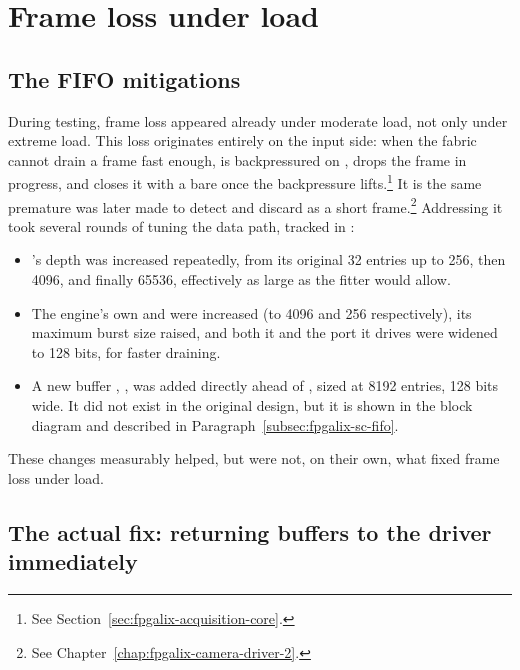 \section{Frame loss under load}
\label{sec:fpgalix-vision-frame-loss}

\subsection{The FIFO mitigations}
\label{subsec:fpgalix-vision-fifo-mitigations}

During testing, frame loss appeared already under moderate  load, not only under extreme load. This loss originates entirely on the input side: when the  fabric cannot drain a frame fast enough,  is backpressured on , drops the frame in progress, and closes it with a bare  once the backpressure lifts.\footnote{See Section~\ref{sec:fpgalix-acquisition-core}.} It is the same premature   was later made to detect and discard as a short frame.\footnote{See Chapter~\ref{chap:fpgalix-camera-driver-2}.} Addressing it took several rounds of tuning the  data path, tracked in :

\begin{itemize}
    \item {}'s depth was increased repeatedly, from its original 32 entries up to 256, then 4096, and finally 65536, effectively as large as the  fitter would allow.
    \item The  engine's own  and  were increased (to 4096 and 256 respectively), its maximum burst size raised, and both it and the   port it drives were widened to 128 bits, for faster draining.
    \item A new buffer , , was added directly ahead of , sized at 8192 entries, 128 bits wide. It did not exist in the original design, but it is shown in the block diagram and described in Paragraph~\ref{subsec:fpgalix-sc-fifo}.
\end{itemize}

These changes measurably helped, but were not, on their own, what fixed frame loss under load.

\subsection{The actual fix: returning buffers to the driver immediately}
\label{subsec:fpgalix-vision-buffer-return}

